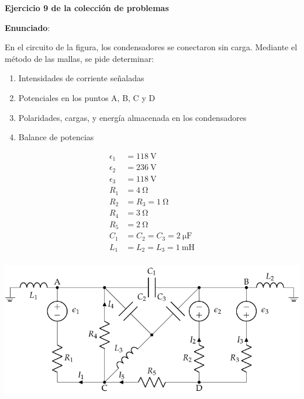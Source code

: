 \documentclass[10pt]{article}
\begin{document}
\large{\textbf{Ejercicio 9 de la colección de problemas}}

\vspace{3mm}
\large{\textbf{Enunciado}}:

\vspace{5mm}

En el circuito de la figura, los condensadores se conectaron sin carga. Mediante el método de las mallas, se pide determinar:
\begin{enumerate}
    \item Intensidades de corriente señaladas
    \item Potenciales en los puntos A, B, C y D
    \item Polaridades, cargas, y energía almacenada en los condensadores
    \item Balance de potencias
\end{enumerate}

\vspace{-3mm}
\begin{minipage}[c]{0.2\linewidth}
  \begin{align*}
    \epsilon_{1}&=\qty{118}{\volt}\\
    \epsilon_{2}&=\qty{236}{\volt}\\
    \epsilon_{3}&=\qty{118}{\volt}\\
    R_{1}&= \qty{4}{\ohm}\\
    R_{2}&=R_{3}=\qty{1}{\ohm}\\
    R_{4}&= \qty{3}{\ohm}\\
    R_{5}&= \qty{2}{\ohm}\\
    C_{1}&=C_{2}=C_{3}=\qty{2}{\micro\farad}\\
    L_1 &= L_2 = L_3 = \qty{1}{\milli\henry}\\
  \end{align*}
\end{minipage}
\begin{minipage}[c]{0.8\linewidth}
  \hspace{-12mm}\includegraphics[scale=1.15]{figs/mallas_condensadores.pdf}
\end{minipage}
\end{document}
